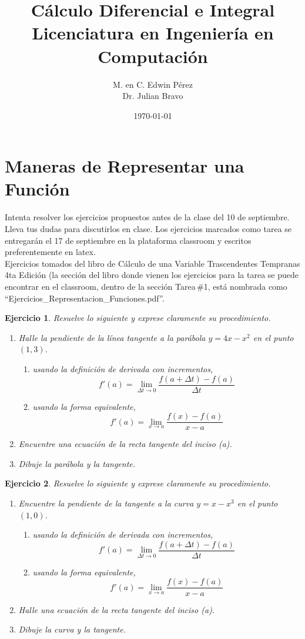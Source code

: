 \documentclass[12pt,tikz,border=5pt]{article}
\title{Cálculo Diferencial e Integral \\ Licenciatura en Ingeniería en Computación}
\author{M. en C. Edwin Pérez \\ Dr. Julian Bravo}
\date{\today}
\newtheorem{ejercicio}{Ejercicio}[section]
\begin{document}
\maketitle

\section{Maneras de Representar una Función}
Intenta resolver los ejercicios propuestos antes de la clase del 10 de septiembre. Lleva tus dudas para discutirlos en clase. Los ejercicios marcados como tarea se entregarán el 17 de septiembre en la plataforma classroom y escritos preferentemente en latex. \\

Ejercicios tomados del libro de Cálculo de una Variable Trascendentes Tempranas 4ta Edición\citep{stewart2001calculo} (la sección del libro donde vienen los ejercicios para la tarea se puede encontrar en el classroom, dentro de la sección Tarea\,\#1, está nombrada como ``Ejercicios\_Representacion\_Funciones.pdf''.

\begin{ejercicio}
  Resuelve lo siguiente y exprese claramente su procedimiento.
  \begin{enumerate}[label=(\alph*)]
    \item Halle la pendiente de la línea tangente a la parábola $y = 4x - x^2$ en el punto $(1, 3)$.
      \begin{enumerate}
        \item usando la definición de derivada con incrementos, $$\displaystyle f'(a) = \lim_{\Delta t \to 0} \frac{f(a+\Delta t)-f(a)}{\Delta t}$$
        \item usando la forma equivalente, $$\displaystyle f'(a) = \lim_{x \to a} \frac{f(x)-f(a)}{x-a}$$
      \end{enumerate}
    \item Encuentre una ecuación de la recta tangente del inciso (a).
    \item Dibuje la parábola y la tangente.
  \end{enumerate}
\end{ejercicio}

\begin{ejercicio}
  Resuelve lo siguiente y exprese claramente su procedimiento.
  \begin{enumerate}[label=(\alph*)]
    \item Encuentre la pendiente de la tangente a la curva $y = x - x^3$ en el punto $(1, 0)$.
      \begin{enumerate}
        \item usando la definición de derivada con incrementos, $$\displaystyle f'(a) = \lim_{\Delta t \to 0} \frac{f(a+\Delta t)-f(a)}{\Delta t}$$
        \item usando la forma equivalente, $$\displaystyle f'(a) = \lim_{x \to a} \frac{f(x)-f(a)}{x-a}$$
      \end{enumerate}
    \item Halle una ecuación de la recta tangente del inciso (a).
    \item Dibuje la curva y la tangente.
  \end{enumerate}
\end{ejercicio}
\end{document}
